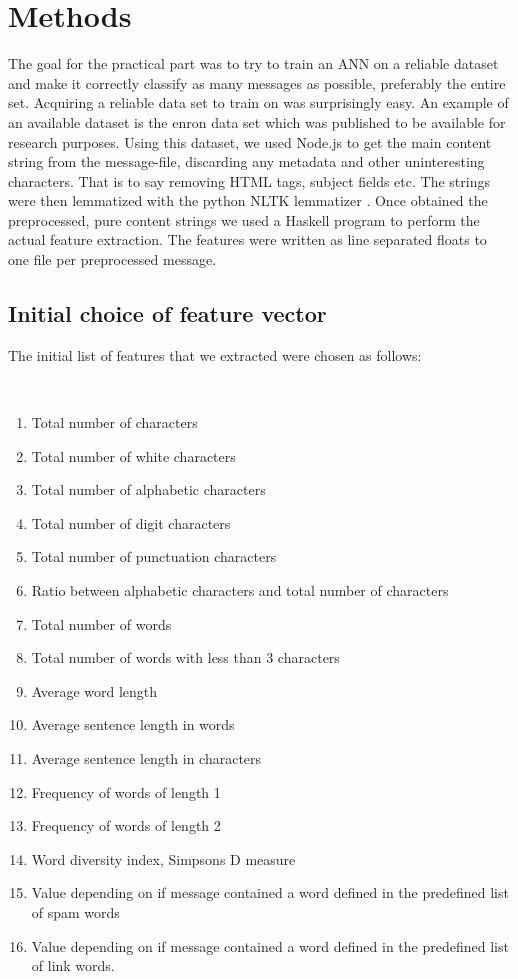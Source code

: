 
\section{Methods}
  
  The goal for the practical part was to try to train an ANN on a reliable
  dataset and make it correctly classify as many messages as possible,
  preferably the entire set.
  Acquiring a reliable data set to train on was surprisingly easy. An
  example of an available dataset is the enron data set \cite{enron} which was
  published to be available for research purposes. Using this dataset, 
  we used Node.js to get the main content string from the
  message-file, discarding any metadata and other uninteresting characters.
  That is to say removing HTML tags, subject fields etc. The strings were then
  lemmatized with the python NLTK lemmatizer \cite{nltk}. Once obtained the
  preprocessed, pure content strings we used a Haskell program to perform the
  actual feature extraction. The features were written as line separated floats
  to one file per preprocessed message.
  \subsection{Initial choice of feature vector}
    The initial list of features that we extracted were chosen as follows:
    \begin{poem}\mbox{}\\[-\baselineskip]
      \begin{enumerate}
        \item Total number of characters
        \item Total number of white characters 
        \item Total number of alphabetic characters
        \item Total number of digit characters
        \item Total number of punctuation characters
        \item Ratio between alphabetic characters and total number of characters
        \item Total number of words
        \item Total number of words with less than 3 characters
        \item Average word length 
        \item Average sentence length in words
        \item Average sentence length in characters
        \item Frequency of words of length 1
        \item Frequency of words of length 2
        \item Word diversity index, Simpsons D measure \cite{simpsons-measure}
        \item Value depending on if message contained a word defined in the
          predefined list of spam words
        \item Value depending on if message contained a word defined in the 
          predefined list of link words.
      \end{enumerate}
    \end{poem} 

